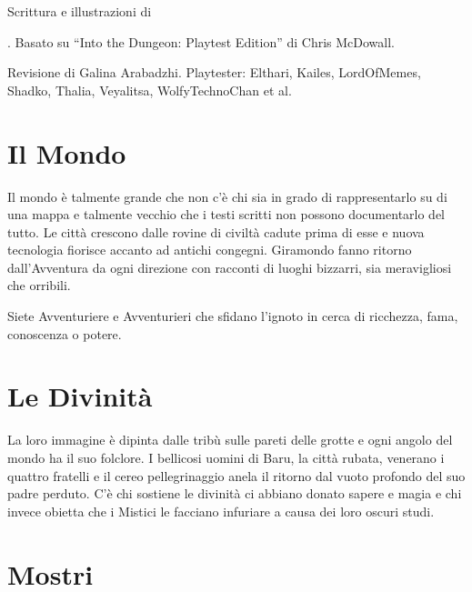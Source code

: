 \documentclass[itdr]{subfiles}
\begin{document}
\begin{minipage}{\textwidth}
\toc[2] %
\end{minipage}

\vfill

\begin{minipage}{\textwidth}
\begin{center}\footnotesize
	Scrittura e illustrazioni di \author{}. Basato su ``Into the Dungeon: Playtest Edition'' di Chris McDowall.
	
	Revisione di Galina Arabadzhi. Playtester: Elthari, Kailes, LordOfMemes, Shadko, Thalia, Veyalitsa, WolfyTechnoChan et al.
\end{center}
\end{minipage}

\clearpage

\label{ch:introduction}


\section*{Il Mondo}

Il mondo è talmente grande che non c’è chi sia in grado di rappresentarlo su di una mappa e talmente vecchio che i testi scritti non possono documentarlo del tutto. Le città crescono dalle rovine di civiltà cadute prima di esse e nuova tecnologia fiorisce accanto ad antichi congegni. \mbox{Giramondo} fanno ritorno dall'Avventura da ogni direzione con racconti di luoghi bizzarri, sia meravigliosi che orribili.

Siete Avventuriere e Avventurieri che sfidano l’ignoto in cerca di ricchezza, fama, conoscenza o potere.

\section*{Le Divinità}

La loro immagine è dipinta dalle tribù sulle pareti delle grotte e ogni angolo del mondo ha il suo folclore. I bellicosi uomini di Baru, la città rubata, venerano i quattro fratelli e il cereo pellegrinaggio anela il ritorno dal vuoto profondo del suo padre perduto. C’è chi sostiene le divinità ci abbiano donato sapere e magia e chi invece obietta che i Mistici le facciano infuriare a causa dei loro oscuri studi.

\section*{Mostri}
\end{document}
